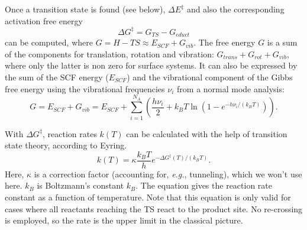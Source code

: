 \documentclass[11pt,DIV=13,BCOR=5mm,a4paper,headinclude]{scrbook}
\begin{document}
Once a transition state is found (see below), $\Delta E^\ddagger$ and also the corresponding activation free energy
\begin{equation}
\Delta G^\ddagger = G_{TS} - G_{educt}
\end{equation}
can be computed, where $G=H-TS\approx E_{SCF} + G_{vib}$.
The free energy $G$ is a sum of the components for translation, rotation and vibration: $G_{trans}+G_{rot}+G_{vib}$, where only the latter is non zero for surface systems.
It can also be expressed by the sum of the SCF energy ($E_{SCF}$) and the vibrational component of the Gibbs free energy using the vibrational frequencies $\nu_i$ from a normal mode analysis:
\begin{equation}
G=E_{SCF} + G_{vib}=E_{SCF}+ \sum_{i=1}^{N_A}(\frac{h\nu_i}{2} + k_BT\ln(1-e^{-h\nu_i/(k_BT)})).
\end{equation}

With $\Delta G^\ddagger$, reaction rates $k(T)$ can be calculated with the help of transition state theory, according to Eyring\cite{eyring,eyring-polanyi}.
\begin{equation}\label{eq:eyring}
k(T)=\kappa\frac{k_BT}{h}e^{-\Delta G^\ddagger(T)/(k_BT)}.
\end{equation}
Here, $\kappa$ is a correction factor (accounting for, \textit{e.g.}, tunneling), which we won't use here. $k_B$ is Boltzmann's constant $k_B$.
The equation gives the reaction rate constant as a function of temperature.
Note that this equation is only valid for cases where all reactants reaching the TS react to the product site.
No re-crossing is employed, so the rate is the upper limit in the classical picture.
\\\\
\end{document}
